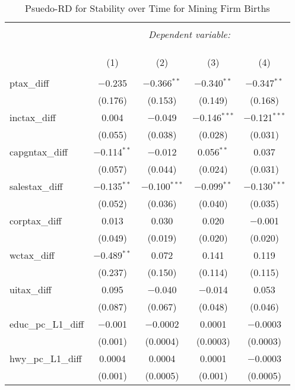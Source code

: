 
\begin{table}[!htbp] \centering 
  \caption{Psuedo-RD for Stability over Time for  Mining Firm Births} 
  \label{} 
\begin{tabular}{@{\extracolsep{5pt}}lcccc} 
\\[-1.8ex]\hline 
\hline \\[-1.8ex] 
 & \multicolumn{4}{c}{\textit{Dependent variable:}} \\ 
\cline{2-5} 
\\[-1.8ex] & \multicolumn{4}{c}{ } \\ 
\\[-1.8ex] & (1) & (2) & (3) & (4)\\ 
\hline \\[-1.8ex] 
 ptax\_diff & $-$0.235 & $-$0.366$^{**}$ & $-$0.340$^{**}$ & $-$0.347$^{**}$ \\ 
  & (0.176) & (0.153) & (0.149) & (0.168) \\ 
  inctax\_diff & 0.004 & $-$0.049 & $-$0.146$^{***}$ & $-$0.121$^{***}$ \\ 
  & (0.055) & (0.038) & (0.028) & (0.031) \\ 
  capgntax\_diff & $-$0.114$^{**}$ & $-$0.012 & 0.056$^{**}$ & 0.037 \\ 
  & (0.057) & (0.044) & (0.024) & (0.031) \\ 
  salestax\_diff & $-$0.135$^{**}$ & $-$0.100$^{***}$ & $-$0.099$^{**}$ & $-$0.130$^{***}$ \\ 
  & (0.052) & (0.036) & (0.040) & (0.035) \\ 
  corptax\_diff & 0.013 & 0.030 & 0.020 & $-$0.001 \\ 
  & (0.049) & (0.019) & (0.020) & (0.020) \\ 
  wctax\_diff & $-$0.489$^{**}$ & 0.072 & 0.141 & 0.119 \\ 
  & (0.237) & (0.150) & (0.114) & (0.115) \\ 
  uitax\_diff & 0.095 & $-$0.040 & $-$0.014 & 0.053 \\ 
  & (0.087) & (0.067) & (0.048) & (0.046) \\ 
  educ\_pc\_L1\_diff & $-$0.001 & $-$0.0002 & 0.0001 & $-$0.0003 \\ 
  & (0.001) & (0.0004) & (0.0003) & (0.0003) \\ 
  hwy\_pc\_L1\_diff & 0.0004 & 0.0004 & 0.0001 & $-$0.0003 \\ 
  & (0.001) & (0.0005) & (0.001) & (0.0005) \\ 

\end{tabular}
\end{table}
